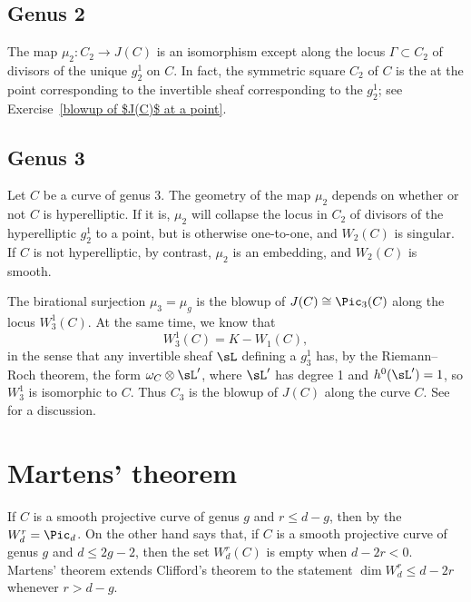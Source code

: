 \subsection*{Genus 2}

The map $\mu_2 : C_{2} \to J(C)$ is an isomorphism except along the
locus $\Gamma \subset  C_{2} $ of divisors of the unique $g^1_2$ on
$C$. In fact, the symmetric square $ C_{2} $ of $C$ is the 
%
%
at the point corresponding to the invertible sheaf
corresponding to the
$g^1_2$; see Exercise~\ref{blowup of $J(C)$ at a point}.


\subsection*{Genus 3}
\begin{fact}
Let $C$ be a curve of genus 3. The geometry of the map $\mu_2$
depends on whether or not $C$ is hyperelliptic. If it is, $\mu_2$
will collapse the locus in $C_2$ of divisors of the hyperelliptic
$g^1_2$ to a point, but is otherwise one-to-one, and $W_2(C)$ is
singular.  If $C$ is not hyperelliptic, by contrast, $\mu_2$ is an
embedding, and $W_2(C)$ is smooth.  

\meshing
The birational surjection $\mu_3 = \mu_g$ is the blowup of 
$J(C) \cong \Pic_3(C)$ along the locus $W^1_3(C)$. At the same time, we know
that
$$
W^1_3(C) = K - W_1(C),
$$
in the sense that any invertible sheaf $\sL$ defining a $g^1_3$ has, by the 
%
Riemann--Roch theorem,
the form $\omega_C\otimes \sL'$,
where $\sL'$ has degree 1 and $h^0(\sL') = 1$,
so $W^1_3$ is isomorphic to $C$. Thus $C_{3}$ is the blowup of $J(C)$ along the curve $C$.
See \cite[pp.~53--4]{MumfordCJ} for a discussion.
\end{fact}

\section{Martens' theorem}

If $C$ is a smooth projective curve of genus $g$ and $r\leq d-g$, then
by the 
%
 $W^{r}_{d} = \Pic_{d}$. On the other hand
%
says that, if $C$ is a smooth projective curve of genus $g$ and $d\leq 2g-2$,
  then the set
 $W^r_d(C)$ is empty when $d-2r<0$. Martens' theorem extends Clifford's theorem to the statement
 $\dim W^r_{d} \leq d-2r$ whenever $r>d-g$.
\label{Martens' theorem}%
 
